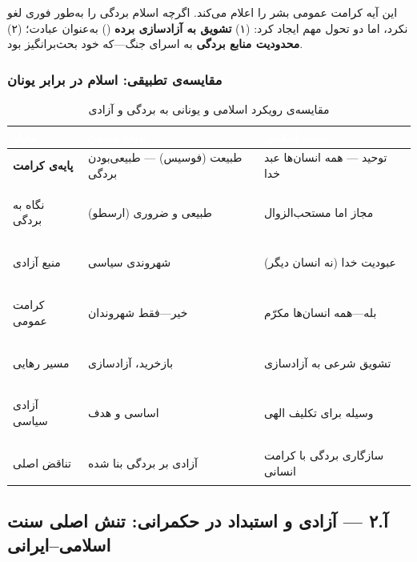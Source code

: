 این آیه کرامت عمومی بشر را اعلام می‌کند. اگرچه اسلام بردگی را به‌طور فوری لغو نکرد، اما دو تحول مهم ایجاد کرد: (۱) \textbf{تشویق به آزادسازی برده} () به‌عنوان عبادت؛ (۲) \textbf{محدودیت منابع بردگی} به اسرای جنگ—که خود بحث‌برانگیز بود.

\subsubsection{مقایسه‌ی تطبیقی: اسلام در برابر یونان}

\begin{table}[h!]
\centering
\caption{مقایسه‌ی رویکرد اسلامی و یونانی به بردگی و آزادی}
\label{tab:islamgreece}
\renewcommand{\arraystretch}{1.6}

\begin{tabularx}{\textwidth}{|>{\bfseries}p{3cm}|>{\raggedright}X|>{\raggedright\arraybackslash}X|}
\hline
\rowcolor{PrimaryDeep}
\textcolor{white}{\textbf{معیار}} &
\textcolor{white}{\textbf{یونان باستان}} &
\textcolor{white}{\textbf{سنت اسلامی}} \\
\hline

\rowcolor{EraAncient!15}
پایه‌ی کرامت & طبیعت (فوسیس) — طبیعی‌بودن بردگی & توحید — همه انسان‌ها عبد خدا \\
\hline

\rowcolor{white}
نگاه به بردگی & طبیعی و ضروری (ارسطو) & مجاز اما مستحب‌الزوال \\
\hline

\rowcolor{EraAncient!15}
منبع آزادی & شهروندی سیاسی & عبودیت خدا (نه انسان دیگر) \\
\hline

\rowcolor{white}
کرامت عمومی & خیر—فقط شهروندان & بله—همه انسان‌ها مکرّم \\
\hline

\rowcolor{EraAncient!15}
مسیر رهایی & بازخرید، آزادسازی & تشویق شرعی به آزادسازی \\
\hline

\rowcolor{white}
آزادی سیاسی & اساسی و هدف & وسیله برای تکلیف الهی \\
\hline

\rowcolor{EraAncient!15}
تناقض اصلی & آزادی بر بردگی بنا شده & سازگاری بردگی با کرامت انسانی \\
\hline

\end{tabularx}
\end{table}

\subsection{آ.۲ — آزادی و استبداد در حکمرانی: تنش اصلی سنت اسلامی–ایرانی}
\label{subsec:islamtyranny}

